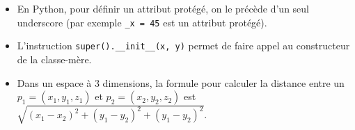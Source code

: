 \begin{Exercice}[15 minutes]
    \begin{conseil}
        \begin{itemize}
            \item En Python, pour définir un attribut protégé, on le précède d'un seul underscore (par exemple \lstinline{_x = 45} est un attribut protégé).
            \item L'instruction \lstinline{super().__init__(x, y)} permet de faire appel au constructeur de la classe-mère.
            \item Dans un espace à 3 dimensions, la formule pour calculer la distance entre un $p_1 = (x_1, y_1, z_1)$ et $p_2 = (x_2, y_2, z_2)$ est $\sqrt{(x_1 - x_2)^2 + (y_1 - y_2)^2 + (y_1 - y_2)^2}$.
        \end{itemize}
    \end{conseil}
    \begin{solution}
     
    \end{solution}
    \end{Exercice} 
    

